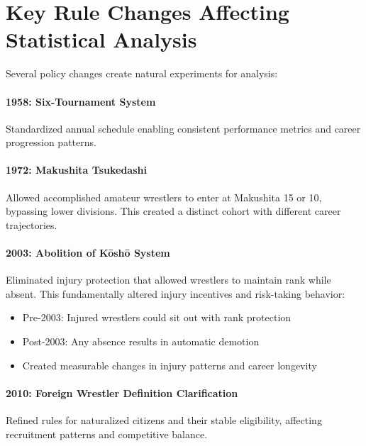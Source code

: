 \section{Key Rule Changes Affecting Statistical Analysis}

Several policy changes create natural experiments for analysis:

\paragraph{1958: Six-Tournament System}
Standardized annual schedule enabling consistent performance metrics and career progression patterns.

\paragraph{1972: Makushita Tsukedashi}
Allowed accomplished amateur wrestlers to enter at Makushita 15 or 10, bypassing lower divisions. This created a distinct cohort with different career trajectories.

\paragraph{2003: Abolition of Kōshō System}
Eliminated injury protection that allowed wrestlers to maintain rank while absent. This fundamentally altered injury incentives and risk-taking behavior:
\begin{itemize}
\item Pre-2003: Injured wrestlers could sit out with rank protection
\item Post-2003: Any absence results in automatic demotion
\item Created measurable changes in injury patterns and career longevity
\end{itemize}

\paragraph{2010: Foreign Wrestler Definition Clarification}
Refined rules for naturalized citizens and their stable eligibility, affecting recruitment patterns and competitive balance.